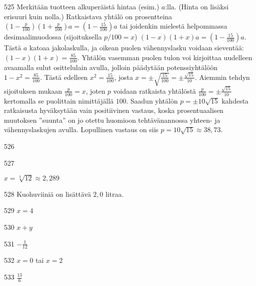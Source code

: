 \begin{Vastaus}{525}
	Merkitään tuotteen alkuperäistä hintaa (esim.) $a$:lla. (Hinta on lisäksi erisuuri kuin nolla.) Ratkaistava yhtälö on prosentteina $(1-\frac{p}{100})(1+\frac{p}{100})a=(1-\frac{15}{100})a$ tai joidenkin mielestä helpommassa desimaalimuodossa (sijoituksella $p/100=x$) $(1-x)(1+x)a=(1-\frac{15}{100})a$. Tästä $a$ katoaa jakolaskulla, ja oikean puolen vähennyslasku voidaan sieventää: $(1-x)(1+x)=\frac{85}{100}$. Yhtälön vasemman puolen tulon voi kirjoittaa uudelleen avaamalla sulut osittelulain avulla, jolloin päädytään potenssiyhtälöön $1-x^2=\frac{85}{100}$. Tästä edelleen $x^2=\frac{15}{100}$, josta $x=\pm \sqrt{\frac{15}{100}}=\pm \frac{\sqrt{15}}{10}$. Aiemmin tehdyn sijoituksen mukaan $\frac{p}{100}=x$, joten $p$ voidaan ratkaista yhtälöstä $\frac{p}{100}=\pm \frac{\sqrt{15}}{10}$ kertomalla se puolittain nimittäjällä $100$. Saadun yhtälön $p=\pm 10\sqrt{15}$ kahdesta ratkaisusta hyväksytään vain positiivinen vastaus, koska prosentuaalisen muutoksen ''suunta'' on jo otettu huomioon tehtävänannossa yhteen- ja vähennyslaskujen avulla. Lopullinen vastaus on siis $p=10\sqrt{15}\approx 38,73$.
	
\end{Vastaus}
\begin{Vastaus}{526}
    
\end{Vastaus}
\begin{Vastaus}{527}

$x=\sqrt[3]{12}\approx2,289$

    
\end{Vastaus}
\begin{Vastaus}{528}
	    Kuohuviiniä on lisättävä $2,0$ litraa.
    
\end{Vastaus}
\begin{Vastaus}{529}
	$x=4$
	
\end{Vastaus}
\begin{Vastaus}{530}
		$x+y$
		
\end{Vastaus}
\begin{Vastaus}{531}
		$-\frac{1}{12}$
	
\end{Vastaus}
\begin{Vastaus}{532}
				$x=0$ tai $x=2$
	
\end{Vastaus}
\begin{Vastaus}{533}
				$\frac{13}{6}$
	
\end{Vastaus}
